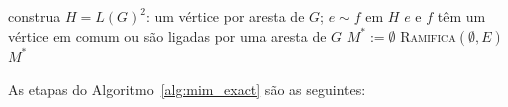 \begin{algorithm}[H]
    \DontPrintSemicolon
    \SetAlgoLined

    \caption{Emparelhamento induzido máximo exato, via conjunto independente máximo em $L(G)^2$ \cite{cameron}}
    \label{alg:mim_exact}

    construa $H = L(G)^2$: um vértice por aresta de $G$; $e \sim f$ em $H$ \KwIff $e$ e $f$ têm um vértice em comum ou são ligadas por uma aresta de $G$\label{mx:build}\;
    $M^* := \emptyset$\label{mx:init}\;
    \textsc{Ramifica}$(\emptyset, E)$\label{mx:call}\;
    \KwRet $M^*$\label{mx:ret}\;

    \bigskip

\end{algorithm}

As etapas do Algoritmo~\ref{alg:mim_exact} são as seguintes:

